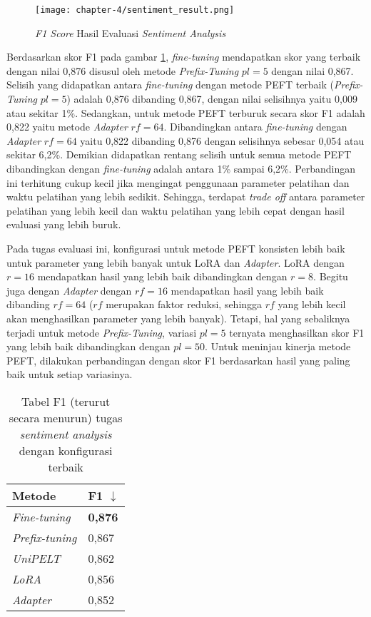 \begin{figure}[h]
    \centering
    \centerline{\texttt{[image: chapter-4/sentiment\_result.png]}}
    \caption{\textit{F1 Score} Hasil Evaluasi \textit{Sentiment Analysis}}
    \label{fig:sentiment-result}
\end{figure}

Berdasarkan skor F1 pada gambar \ref{fig:sentiment-result}, \textit{fine-tuning} mendapatkan skor yang terbaik dengan nilai 0,876 disusul oleh metode \textit{Prefix-Tuning} $pl=5$ dengan nilai 0,867. Selisih yang didapatkan antara \textit{fine-tuning} dengan metode PEFT terbaik (\textit{Prefix-Tuning} $pl=5$) adalah 0,876 dibanding 0,867, dengan nilai selisihnya yaitu 0,009 atau sekitar 1\%. Sedangkan, untuk metode PEFT terburuk secara skor F1 adalah 0,822 yaitu metode \textit{Adapter} $rf=64$. Dibandingkan antara \textit{fine-tuning} dengan \textit{Adapter} $rf=64$ yaitu 0,822 dibanding 0,876 dengan selisihnya sebesar 0,054 atau sekitar 6,2\%. Demikian didapatkan rentang selisih untuk semua metode PEFT dibandingkan dengan \textit{fine-tuning} adalah antara 1\% sampai 6,2\%. Perbandingan ini terhitung cukup kecil jika mengingat penggunaan parameter pelatihan dan waktu pelatihan yang lebih sedikit. Sehingga, terdapat \textit{trade off} antara parameter pelatihan yang lebih kecil dan waktu pelatihan yang lebih cepat dengan hasil evaluasi yang lebih buruk.

Pada tugas evaluasi ini, konfigurasi untuk metode PEFT konsisten lebih baik untuk parameter yang lebih banyak untuk LoRA dan \textit{Adapter}. LoRA dengan $r=16$ mendapatkan hasil yang lebih baik dibandingkan dengan $r=8$. Begitu juga dengan \textit{Adapter} dengan $rf=16$ mendapatkan hasil yang lebih baik dibanding $rf=64$ ($rf$ merupakan faktor reduksi, sehingga $rf$ yang lebih kecil akan menghasilkan parameter yang lebih banyak). Tetapi, hal yang sebaliknya terjadi untuk metode \textit{Prefix-Tuning}, variasi $pl=5$ ternyata menghasilkan skor F1 yang lebih baik dibandingkan dengan $pl=50$. Untuk meninjau kinerja metode PEFT, dilakukan perbandingan dengan skor F1 berdasarkan hasil yang paling baik untuk setiap variasinya.

\begin{table}[h]
    \centering
    \caption{Tabel F1 (terurut secara menurun) tugas \textit{sentiment analysis} dengan konfigurasi terbaik}
    \label{table:sentiment-result-desc}
    \begin{tabular}{l|l}
        \toprule
        \textbf{Metode} & \textbf{F1 $\downarrow$} \\
        \midrule
        \textit{Fine-tuning} & \textbf{0,876} \\
        \textit{Prefix-tuning} & 0,867 \\
        \textit{UniPELT} & 0,862 \\
        \textit{LoRA} & 0,856 \\
        \textit{Adapter} & 0,852 \\
        \bottomrule
    \end{tabular}
\end{table}

